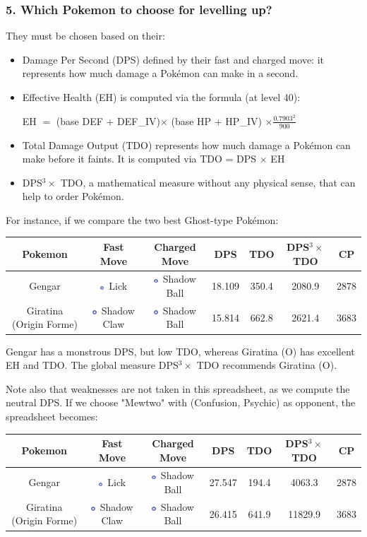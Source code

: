 \documentclass[8pt,aspectratio=169,compress]{beamer}
\newcommand{\ghostsimp}{\includegraphics[height=0.15cm]{../../images/type/simplified/ghost.png}}
\begin{document}
\begin{frame}
\frametitle{5. Which Pokemon to choose for levelling up?}

\begin{block}{}
\begin{tiny}

They must be chosen based on their:
\begin{itemize}
  \item Damage Per Second (DPS) defined by their fast and charged move: it represents how much damage a Pok\'emon can make in a second.
  \item Effective Health (EH) is computed via the formula (at level 40):
\begin{center}
EH $=$ (base DEF + DEF\_IV)$\times$ (base HP + HP\_IV) $\times \frac{0.7903^2}{900}$
\end{center}
  \item Total Damage Output (TDO) represents how much damage a Pok\'emon can make before it faints. It is computed via TDO = DPS $\times$ EH
  \item  DPS$^3 \times$ TDO, a mathematical measure without any physical sense, that can help to order Pok\'emon.
\end{itemize} 

\begin{center}
   \href{https://pokemongo.gamepress.gg/comprehensive-dps-spreadsheet}{}
\end{center}

For instance, if we compare the two best Ghost-type Pokémon:
\begin{center}
\begin{tabular}{ccccccc}
Pokemon & Fast Move & Charged Move & DPS & TDO & DPS$^3 \times$ TDO & CP \\ \hline
Gengar&	\ghostsimp~Lick	&\ghostsimp~Shadow Ball	&18.109	&350.4	&2080.9	&2878\\ 
Giratina (Origin Forme)&	\ghostsimp~Shadow Claw	&\ghostsimp~Shadow Ball&	15.814	&662.8	&2621.4	&3683\\ 
\end{tabular}
\end{center}

Gengar has a monstrous DPS, but low TDO, whereas Giratina (O) has excellent EH and TDO. The global measure  DPS$^3 \times$ TDO recommends Giratina (O).

Note also that weaknesses are not taken in this spreadsheet, as we compute the neutral DPS. If we choose "Mewtwo" with (Confusion, Psychic) as opponent, the spreadsheet becomes:
\begin{center}
\begin{tabular}{ccccccc}
Pokemon & Fast Move & Charged Move & DPS & TDO & DPS$^3 \times$ TDO & CP \\ \hline
Gengar&	\ghostsimp~Lick	&\ghostsimp~Shadow Ball	&27.547& 194.4 & 4063.3& 2878\\ 
Giratina (Origin Forme)&	\ghostsimp~Shadow Claw	&\ghostsimp~Shadow Ball&	26.415	&641.9	&11829.9	&3683\\ 
\end{tabular}
\end{center}


\end{tiny}
\end{block}
\end{frame}
\end{document}
